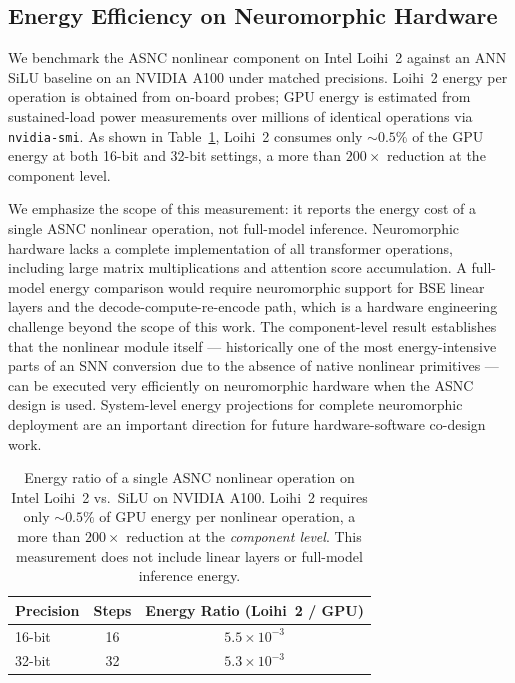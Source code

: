 \documentclass{article}
\theoremstyle{plain}
\theoremstyle{definition}
\theoremstyle{remark}
\begin{document}
\subsection{Energy Efficiency on Neuromorphic Hardware}
\label{subsec:exp_energy}

We benchmark the ASNC nonlinear component on Intel Loihi~2 against an ANN SiLU
baseline on an NVIDIA A100 under matched precisions. Loihi~2 energy per operation is
obtained from on-board probes; GPU energy is estimated from sustained-load power
measurements over millions of identical operations via \texttt{nvidia-smi}. As shown
in Table~\ref{tab:energy}, Loihi~2 consumes only ${\sim}0.5\%$ of the GPU energy at
both 16-bit and 32-bit settings, a more than $200\times$ reduction at the component
level.

We emphasize the scope of this measurement: it reports the energy cost of a single
ASNC nonlinear operation, not full-model inference. Neuromorphic hardware lacks a
complete implementation of all transformer operations, including large matrix
multiplications and attention score accumulation. A full-model energy comparison
would require neuromorphic support for BSE linear layers and the decode-compute-re-encode
path, which is a hardware engineering challenge beyond the scope of this work.
The component-level result establishes that the nonlinear module itself — historically
one of the most energy-intensive parts of an SNN conversion due to the absence of
native nonlinear primitives — can be executed very efficiently on neuromorphic
hardware when the ASNC design is used. System-level energy projections for complete
neuromorphic deployment are an important direction for future hardware-software
co-design work.

\begin{table}[h!]
\centering
\caption{Energy ratio of a single ASNC nonlinear operation on Intel Loihi~2 vs.\
SiLU on NVIDIA A100. Loihi~2 requires only ${\sim}0.5\%$ of GPU energy per
nonlinear operation, a more than $200\times$ reduction at the \emph{component level}.
This measurement does not include linear layers or full-model inference energy.}
\label{tab:energy}
\small
\begin{tabular}{lcc}
\toprule
\textbf{Precision} & \textbf{Steps} & \textbf{Energy Ratio (Loihi~2 / GPU)} \\
\midrule
16-bit & 16 & $5.5 \times 10^{-3}$ \\
32-bit & 32 & $5.3 \times 10^{-3}$ \\
\bottomrule
\end{tabular}
\end{table}
\end{document}
